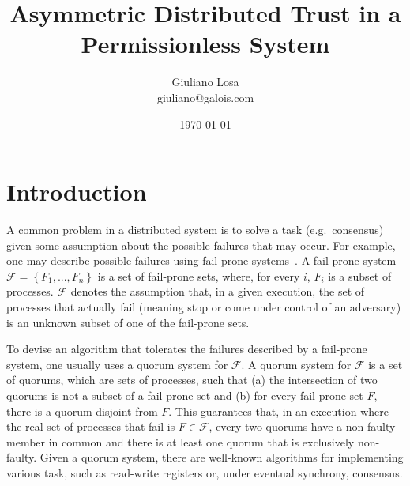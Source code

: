 \documentclass[11pt]{article}
\title{Asymmetric Distributed Trust in a Permissionless System}
\date{\today}
\author{Giuliano Losa\\giuliano@galois.com}
\begin{document}
\maketitle


\section{Introduction}


A common problem in a distributed system is to solve a task (e.g.\ consensus) given some assumption about the possible failures that may occur. For example, one may describe possible failures using fail-prone systems~\cite{malkhiByzantineQuorumSystems1998,hirtPlayerSimulationGeneral2000}. A fail-prone system $\mathcal{F}=\left\{F_1,...,F_n\right\}$ is a set of fail-prone sets, where, for every $i$, $F_i$ is a subset of processes. $\mathcal{F}$ denotes the assumption that, in a given execution, the set of processes that actually fail (meaning stop or come under control of an adversary) is an unknown subset of one of the fail-prone sets.

To devise an algorithm that tolerates the failures described by a fail-prone system, one usually uses a quorum system for $\mathcal{F}$. A quorum system for $\mathcal{F}$ is a set of quorums, which are sets of processes, such that (a) the intersection of two quorums is not a subset of a fail-prone set and (b) for every fail-prone set $F$, there is a quorum disjoint from $F$. This guarantees that, in an execution where the real set of processes that fail is $F\in\mathcal{F}$, every two quorums have a non-faulty member in common and there is at least one quorum that is exclusively non-faulty. Given a quorum system, there are well-known algorithms for implementing various task, such as read-write registers or, under eventual synchrony, consensus.
\end{document}
